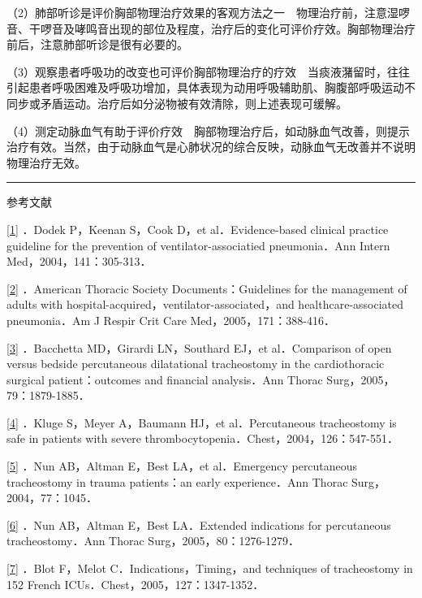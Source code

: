 （2）肺部听诊是评价胸部物理治疗效果的客观方法之一　物理治疗前，注意湿啰音、干啰音及哮鸣音出现的部位及程度，治疗后的变化可评价疗效。胸部物理治疗前后，注意肺部听诊是很有必要的。

（3）观察患者呼吸功的改变也可评价胸部物理治疗的疗效　当痰液潴留时，往往引起患者呼吸困难及呼吸功增加，具体表现为动用呼吸辅助肌、胸腹部呼吸运动不同步或矛盾运动。治疗后如分泌物被有效清除，则上述表现可缓解。

（4）测定动脉血气有助于评价疗效　胸部物理治疗后，如动脉血气改善，则提示治疗有效。当然，由于动脉血气是心肺状况的综合反映，动脉血气无改善并不说明物理治疗无效。

\begin{center}\rule{0.5\linewidth}{\linethickness}\end{center}

参考文献

\protect\hyperlink{text00015.htmlux5cux23ch1-14-back}{{[}1{]}} ．Dodek
P，Keenan S，Cook D，et al．Evidence-based clinical practice guideline
for the prevention of ventilator-associatied pneumonia．Ann Intern
Med，2004，141：305-313．

\protect\hyperlink{text00015.htmlux5cux23ch2-14-back}{{[}2{]}}
．American Thoracic Society Documents：Guidelines for the management of
adults with hospital-acquired，ventilator-associated，and
healthcare-associated pneumonia．Am J Respir Crit Care
Med，2005，171：388-416．

\protect\hyperlink{text00015.htmlux5cux23ch3-14-back}{{[}3{]}}
．Bacchetta MD，Girardi LN，Southard EJ，et al．Comparison of open
versus bedside percutaneous dilatational tracheostomy in the
cardiothoracic surgical patient：outcomes and financial analysis．Ann
Thorac Surg，2005，79：1879-1885．

\protect\hyperlink{text00015.htmlux5cux23ch4-14-back}{{[}4{]}} ．Kluge
S，Meyer A，Baumann HJ，et al．Percutaneous tracheostomy is safe in
patients with severe thrombocytopenia．Chest，2004，126：547-551．

\protect\hyperlink{text00015.htmlux5cux23ch5-14-back}{{[}5{]}} ．Nun
AB，Altman E，Best LA，et al．Emergency percutaneous tracheostomy in
trauma patients：an early experience．Ann Thorac Surg，2004，77：1045．

\protect\hyperlink{text00015.htmlux5cux23ch6-14-back}{{[}6{]}} ．Nun
AB，Altman E，Best LA．Extended indications for percutaneous
tracheostomy．Ann Thorac Surg，2005，80：1276-1279．

\protect\hyperlink{text00015.htmlux5cux23ch7-14-back}{{[}7{]}} ．Blot
F，Melot C．Indications，Timing，and techniques of tracheostomy in 152
French ICUs．Chest，2005，127：1347-1352．

